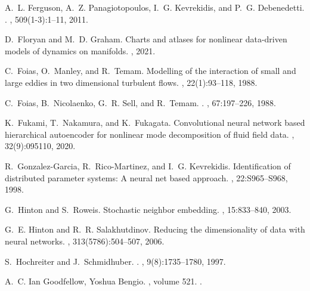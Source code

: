 \documentclass[preprint,aps,pre,letterpaper,onecolumn,superscriptaddress]{revtex4-2} %
\begin{document}
\begin{thebibliography}{10}
A.~L. Ferguson, A.~Z. Panagiotopoulos, I.~G. Kevrekidis, and P.~G. Debenedetti.
.
, 509(1-3):1--11, 2011.

D.~Floryan and M.~D. Graham.
\newblock Charts and atlases for nonlinear data-driven models of dynamics on
  manifolds.
, 2021.

C.~Foias, O.~Manley, and R.~Temam.
\newblock Modelling of the interaction of small and large eddies in two
  dimensional turbulent flows.
, 22(1):93--118, 1988.

C.~Foias, B.~Nicolaenko, G.~R. Sell, and R.~Temam.
.
, 67:197--226, 1988.

K.~Fukami, T.~Nakamura, and K.~Fukagata.
\newblock Convolutional neural network based hierarchical autoencoder for
  nonlinear mode decomposition of fluid field data.
, 32(9):095110, 2020.

R.~Gonzalez-Garcia, R.~Rico-Martinez, and I.~G. Kevrekidis.
\newblock Identification of distributed parameter systems: A neural net based
  approach.
, 22:S965--S968, 1998.

G.~Hinton and S.~Roweis.
\newblock Stochastic neighbor embedding.
, 15:833--840,
  2003.

G.~E. Hinton and R.~R. Salakhutdinov.
\newblock Reducing the dimensionality of data with neural networks.
, 313(5786):504--507, 2006.

S.~Hochreiter and J.~Schmidhuber.
.
, 9(8):1735--1780, 1997.

A.~C. {Ian Goodfellow, Yoshua Bengio}.
, volume 521.
.


\end{thebibliography}
\end{document}

